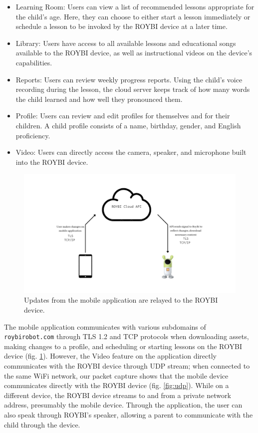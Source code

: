 \documentclass[12pt]{ucthesis}
\begin{document}
\begin{itemize}
    \item Learning Room: Users can view a list of recommended lessons appropriate for the child's age. Here, they can choose to either start a lesson immediately or schedule a lesson to be invoked by the ROYBI device at a later time.
    \item Library: Users have access to all available lessons and educational songs available to the ROYBI device, as well as instructional videos on the device's capabilities.
    \item Reports: Users can review weekly progress reports. Using the child's voice recording during the lesson, the cloud server keeps track of how many words the child learned and how well they pronounced them.
    \item Profile: Users can review and edit profiles for themselves and for their children. A child profile consists of a name, birthday, gender, and English proficiency.
    \item Video: Users can directly access the camera, speaker, and microphone built into the ROYBI device.
\end{itemize}

\begin{figure}
    \includegraphics[width=\textwidth]{changes on app.jpg}
    \caption{Updates from the mobile application are relayed to the ROYBI device.}
    \label{fig:roybiapp}
\end{figure}

The mobile application communicates with various subdomains of \texttt{roybirobot.com} through TLS 1.2 and TCP protocols when downloading assets, making changes to a profile, and scheduling or starting lessons on the ROYBI device (fig. \ref{fig:roybiapp}). However, the Video feature on the application directly communicates with the ROYBI device through UDP stream; when connected to the same WiFi network, our packet capture shows that the mobile device communicates directly with the ROYBI device (fig. \ref{fig:udp}). While on a different device, the ROYBI device streams to and from a private network address, presumably the mobile device. Through the application, the user can also speak through ROYBI's speaker, allowing a parent to communicate with the child through the device.
\end{document}
